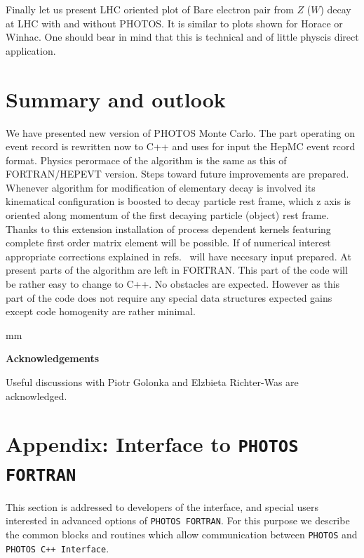 \documentclass[]{Photos_interface_design}
\begin{document}
Finally
let us present LHC oriented plot of Bare electron pair from $Z$ ($W$) decay 
at LHC 
with and without PHOTOS. It is similar to plots shown for Horace or Winhac. 
One should bear in mind that this is technical and of little physcis direct 
application.

\section{Summary and outlook}
We have presented new version  of PHOTOS Monte Carlo. The part operating on 
event record is rewritten now to C++ and uses for input the HepMC event rcord 
format. Physics perormace of the algorithm is the same  as this of 
FORTRAN/HEPEVT version. Steps toward future improvements are prepared. 
Whenever algorithm for modification of elementary decay is involved its 
kinematical configuration is boosted to decay particle rest frame, which 
z axis is oriented along momentum of the first decaying particle (object) 
rest frame. Thanks to this extension  installation of process dependent 
kernels featuring complete first order matrix element will be possible.
If of numerical interest appropriate corrections explained in 
refs.~\cite{Golonka:2006tw,Nanava:2006vv,Nanava:2009vg}  will have necesary input prepared.
At present parts of the algorithm are left in FORTRAN. This part of the code 
will be rather easy to change to C++. No obstacles are expected. However as this part of the code does not require any special data structures expected gains
except code homogenity are rather minimal.  

 mm

\centerline{\large\bf Acknowledgements}

Useful discussions with Piotr Golonka and Elzbieta Richter-Was are 
acknowledged.
\newpage

{}







\newpage
\appendix

\section{Appendix: Interface to {\tt PHOTOS FORTRAN}}
\label{Interface to PHOTOS}

This section is addressed to developers of the interface, 
and special users interested in advanced options of {\tt PHOTOS FORTRAN}.
For this purpose we describe the common blocks and routines which allow
communication between {\tt PHOTOS} and {\tt PHOTOS C++ Interface}. 
\end{document}
